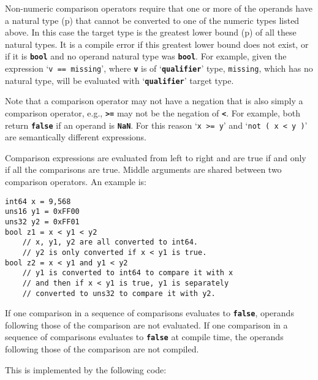 \documentclass[12pt]{article}
\newcommand{\TT}[1]{{\tt \bfseries #1}}
\newcommand{\pagref}[1]{p\pageref{#1}}
\newenvironment{indpar}[1][0.3in]%
	{\begin{list}{}%
		     {\setlength{\itemsep}{0in}%
		      \setlength{\topsep}{0in}%
		      \setlength{\parsep}{1ex}%
		      \setlength{\labelwidth}{#1}%
		      \setlength{\leftmargin}{#1}%
		      \addtolength{\leftmargin}{\labelsep}}%
	 \item}%
	{\end{list}}
\begin{document}
Non-numeric comparison operators require that one or more of
the operands have a natural type (\pagref{NATURAL-TYPE}) that
cannot be converted to one of the numeric types listed above.
In this case the target type is
the greatest lower bound (\pagref{GREATEST-LOWER-BOUND})
of all these natural types.
It is a compile error if this greatest lower bound does
not exist, or if it is \TT{bool} and no operand natural type was \TT{bool}.
For example, given the expression `{\tt v == missing}', where \TT{v}
is of `\TT{qualifier}' type, {\tt missing}, which has no natural type, will be
evaluated with `\TT{qualifier}' target type.

Note that a comparison operator may not have a negation that is
also simply a comparison operator, e.g., \TT{>=} may not be the
negation of \TT{<}.  For example, both return \TT{false} if an
operand is \TT{NaN}.  For this reason `{\tt x >= y}' and
`{\tt not ( x < y )}' are semantically different expressions.

Comparison expressions are evaluated from left to right and are
true if and only if all the comparisons are true.  Middle
arguments are shared between two comparison operators.
An example is:

\begin{indpar}\begin{verbatim}
int64 x = 9,568
uns16 y1 = 0xFF00
uns32 y2 = 0xFF01
bool z1 = x < y1 < y2
    // x, y1, y2 are all converted to int64.
    // y2 is only converted if x < y1 is true.
bool z2 = x < y1 and y1 < y2
    // y1 is converted to int64 to compare it with x
    // and then if x < y1 is true, y1 is separately
    // converted to uns32 to compare it with y2.
\end{verbatim}\end{indpar}

If one comparison in a sequence of comparisons evaluates
to \TT{false}, operands following those of the comparison
are not evaluated.  If one comparison in a sequence of comparisons
evaluates to \TT{false} at compile time,
the operands following those of the comparison are not compiled.

This is implemented by the following code:
\end{document}

